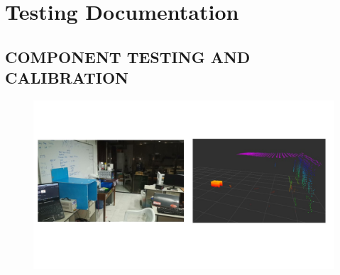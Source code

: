 \chapter{Testing Documentation}
\label{appen:b}

\section*{COMPONENT TESTING AND CALIBRATION}

\begin{figure}[H]
	\centering
	\includegraphics[width=1\textwidth]{Figures/Appendecis/testing/Slide1}
\end{figure}

